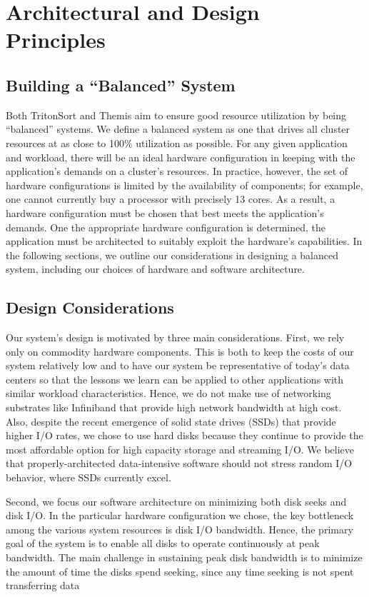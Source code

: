 \chapter{Architectural and Design Principles}
\label{chapter:principles}

\section{Building a ``Balanced'' System}

Both TritonSort and Themis aim to ensure good resource utilization by being
``balanced'' systems. We define a balanced system as one that drives all
cluster resources at as close to 100\% utilization as possible. For any given
application and workload, there will be an ideal hardware configuration in
keeping with the application's demands on a cluster's resources. In practice,
however, the set of hardware configurations is limited by the availability of
components; for example, one cannot currently buy a processor with precisely 13
cores. As a result, a hardware configuration must be chosen that best meets the
application's demands.  One the appropriate hardware configuration is
determined, the application must be architected to suitably exploit the
hardware's capabilities. In the following sections, we outline our
considerations in designing a balanced system, including our choices of
hardware and software architecture.

\section{Design Considerations}

Our system's design is motivated by three main considerations.  First, we rely
only on commodity hardware components.  This is both to keep the costs of our
system relatively low and to have our system be representative of today's data
centers so that the lessons we learn can be applied to other applications with
similar workload characteristics.  Hence, we do not make use of networking
substrates like Infiniband that provide high network bandwidth at high cost.
Also, despite the recent emergence of solid state drives (SSDs) that provide
higher I/O rates, we chose to use hard disks because they continue to provide
the most affordable option for high capacity storage and streaming I/O.  We
believe that properly-architected data-intensive software should not stress
random I/O behavior, where SSDs currently excel.

Second, we focus our software architecture on minimizing both disk seeks and
disk I/O.  In the particular hardware configuration we chose, the key
bottleneck among the various system resources is disk I/O bandwidth.  Hence,
the primary goal of the system is to enable all disks to operate continuously
at peak bandwidth.  The main challenge in sustaining peak disk bandwidth is to
minimize the amount of time the disks spend seeking, since any time
seeking is not spent transferring data

